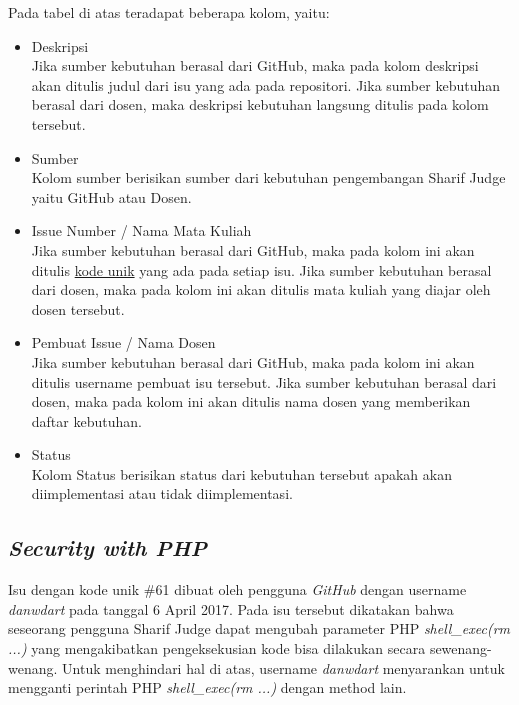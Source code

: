 Pada tabel di atas teradapat beberapa kolom, yaitu:
\begin{itemize}
	\item Deskripsi \\
	Jika sumber kebutuhan berasal dari GitHub, maka pada kolom deskripsi akan ditulis judul dari isu yang ada pada repositori. Jika sumber kebutuhan berasal dari dosen, maka deskripsi kebutuhan langsung ditulis pada kolom tersebut.
	\item Sumber \\
	Kolom sumber berisikan sumber dari kebutuhan pengembangan Sharif Judge yaitu GitHub atau Dosen.
	\item Issue Number / Nama Mata Kuliah \\
	Jika sumber kebutuhan berasal dari GitHub, maka pada kolom ini akan ditulis \hyperref[sec:analisis]{kode unik} yang ada pada setiap isu. Jika sumber kebutuhan berasal dari dosen, maka pada kolom ini akan ditulis mata kuliah yang diajar oleh dosen tersebut.
	\item Pembuat Issue / Nama Dosen \\
	Jika sumber kebutuhan berasal dari GitHub, maka pada kolom ini akan ditulis username pembuat isu tersebut. Jika sumber kebutuhan berasal dari dosen, maka pada kolom ini akan ditulis nama dosen yang memberikan daftar kebutuhan.
	\item Status \\
	Kolom Status berisikan status dari kebutuhan tersebut apakah akan diimplementasi atau tidak diimplementasi.
\end{itemize}


\subsection{\textit{Security with PHP}}
Isu dengan kode unik \#61 dibuat oleh pengguna \textit{GitHub} dengan username \textit{danwdart} pada tanggal 6 April 2017. Pada isu tersebut dikatakan bahwa seseorang pengguna Sharif Judge dapat mengubah parameter PHP \textit{shell\_exec(rm ...)} yang mengakibatkan pengeksekusian kode bisa dilakukan secara sewenang-wenang. Untuk menghindari hal di atas, username \textit{danwdart} menyarankan untuk mengganti perintah PHP \textit{shell\_exec(rm ...)} dengan method lain.

